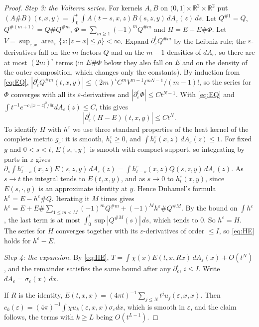 \documentclass[pdflatex,sn-mathphys-num]{sn-jnl}
\theoremstyle{thmstyleone}%
\theoremstyle{thmstylethree}%
\newcommand{\R}{\mathbb{R}}
\begin{document}
\begin{appendices}
\begin{proof}
\emph{Step 3: the Volterra series.} For kernels $A,B$ on $(0,1]\times\R^2\times\R^2$ put $(A\#B)(t,x,y)=\int_0^t\int A(t-s,x,z)B(s,z,y)\,dA_\varepsilon(z)\,ds$. Let $Q^{\#1}=Q$, $Q^{\#(m+1)}=Q\#Q^{\#m}$, $\Phi=\sum_{m\ge1}(-1)^mQ^{\#m}$ and $H=E+E\#\Phi$. Let $V=\sup_{\varepsilon,x}\operatorname{area}_\varepsilon\{z:|z-x|\le\rho\}<\infty$. Expand $\partial_\varepsilon^iQ^{\#m}$ by the Leibniz rule; the $\varepsilon$-derivatives fall on the $m$ factors $Q$ and on the $m-1$ densities of $dA_\varepsilon$, so there are at most $(2m)^i$ terms (in $E\#\Phi$ below they also fall on $E$ and on the density of the outer composition, which changes only the constants). By induction from \eqref{eq:EQ}, $|\partial_\varepsilon^iQ^{\#m}(t,x,y)|\le(2m)^iC^mV^{m-1}t^{mN-1}/(m-1)!$, so the series for $\Phi$ converges with all its $\varepsilon$-derivatives and $|\partial_\varepsilon^i\Phi|\le Ct^{N-1}$. With \eqref{eq:EQ} and $\int t^{-1}e^{-c_1|x-z|^2/8t}dA_\varepsilon(z)\le C$, this gives
\begin{equation}\label{eq:HE}
|\partial_\varepsilon^i(H-E)(t,x,y)|\le Ct^N.
\end{equation}
To identify $H$ with $h^\varepsilon$ we use three standard properties of the heat kernel of the complete metric $g_\varepsilon$: it is smooth, $h^\varepsilon_t\ge0$, and $\int h^\varepsilon_t(x,z)\,dA_\varepsilon(z)\le1$. For fixed $y$ and $0<s<t$, $E(s,\cdot,y)$ is smooth with compact support, so integrating by parts in $z$ gives $\partial_s\int h^\varepsilon_{t-s}(x,z)E(s,z,y)\,dA_\varepsilon(z)=\int h^\varepsilon_{t-s}(x,z)Q(s,z,y)\,dA_\varepsilon(z)$. As $s\to t$ the integral tends to $E(t,x,y)$, and as $s\to0$ to $h^\varepsilon_t(x,y)$, since $E(s,\cdot,y)$ is an approximate identity at $y$. Hence Duhamel's formula $h^\varepsilon=E-h^\varepsilon\#Q$. Iterating it $M$ times gives $h^\varepsilon=E+E\#\sum_{1\le m<M}(-1)^mQ^{\#m}+(-1)^Mh^\varepsilon\#Q^{\#M}$. By the bound on $\int h^\varepsilon$, the last term is at most $\int_0^t\sup|Q^{\#M}(s)|\,ds$, which tends to $0$. So $h^\varepsilon=H$. The series for $H$ converges together with its $\varepsilon$-derivatives of order $\le I$, so \eqref{eq:HE} holds for $h^\varepsilon-E$.

\emph{Step 4: the expansion.} By \eqref{eq:HE}, $T=\int\chi(x)E(t,x,Rx)\,dA_\varepsilon(x)+O(t^N)$, and the remainder satisfies the same bound after any $\partial_\varepsilon^i$, $i\le I$. Write $dA_\varepsilon=\sigma_\varepsilon(x)\,dx$.

If $R$ is the identity, $E(t,x,x)=(4\pi t)^{-1}\sum_{j\le N}t^ju_j(\varepsilon,x,x)$. Then $c_k(\varepsilon)=(4\pi)^{-1}\int\chi u_k(\varepsilon,x,x)\sigma_\varepsilon dx$, which is smooth in $\varepsilon$, and the claim follows, the terms with $k\ge L$ being $O(t^{L-1})$.


\end{proof}
\end{appendices}
\end{document}
